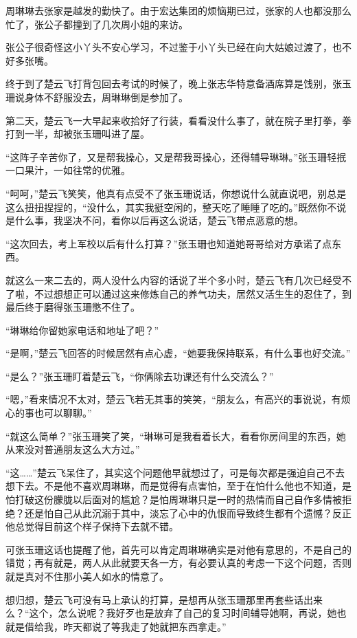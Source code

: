 周琳琳去张家是越发的勤快了。由于宏达集团的烦恼期已过，张家的人也都没那么忙了，张公子都撞到了几次周小姐的来访。

张公子很奇怪这小丫头不安心学习，不过鉴于小丫头已经在向大姑娘过渡了，也不好多张嘴。

终于到了楚云飞打背包回去考试的时候了，晚上张志华特意备酒席算是饯别，张玉珊说身体不舒服没去，周琳琳倒是参加了。

第二天，楚云飞一大早起来收拾好了行装，看看没什么事了，就在院子里打拳，拳打到一半，却被张玉珊叫进了屋。

“这阵子辛苦你了，又是帮我操心，又是帮我哥操心，还得辅导琳琳。”张玉珊轻抿一口果汁，一如往常的优雅。

“呵呵，”楚云飞笑笑，他真有点受不了张玉珊说话，你想说什么就直说吧，别总是这么扭扭捏捏的，“没什么，其实我挺空闲的，整天吃了睡睡了吃的。”既然你不说是什么事，我坚决不问，看你以后再这么说话，楚云飞带点恶意的想。

“这次回去，考上军校以后有什么打算？”张玉珊也知道她哥哥给对方承诺了点东西。

就这么一来二去的，两人没什么内容的话说了半个多小时，楚云飞有几次已经受不了啦，不过想想正可以通过这来修炼自己的养气功夫，居然又活生生的忍住了，到最后终于磨得张玉珊憋不住了。

“琳琳给你留她家电话和地址了吧？”

“是啊，”楚云飞回答的时候居然有点心虚，“她要我保持联系，有什么事也好交流。”

“是么？”张玉珊盯着楚云飞，“你俩除去功课还有什么交流么？”

“嗯，”看来情况不太对，楚云飞若无其事的笑笑，“朋友么，有高兴的事说说，有烦心的事也可以聊聊。”

“就这么简单？”张玉珊笑了笑，“琳琳可是我看着长大，看看你房间里的东西，她从来没对普通朋友这么大方过。”

“这……”楚云飞呆住了，其实这个问题他早就想过了，可是每次都是强迫自己不去想下去。不是他不喜欢周琳琳，而是觉得有点害怕，至于在怕什么他也不知道，是怕打破这份朦胧以后面对的尴尬？是怕周琳琳只是一时的热情而自己自作多情被拒绝？还是怕自己从此沉溺于其中，淡忘了心中的仇恨而导致终生都有个遗憾？反正他总觉得目前这个样子保持下去就不错。

可张玉珊这话也提醒了他，首先可以肯定周琳琳确实是对他有意思的，不是自己的错觉；再有就是，两人从此就要天各一方，有必要认真的考虑一下这个问题，否则就是真对不住那小美人如水的情意了。

想归想，楚云飞可没有马上承认的打算，是想再从张玉珊那里再套些话出来么？“这个，怎么说呢？我好歹也是放弃了自己的复习时间辅导她啊，再说，她也就是借给我，昨天都说了等我走了她就把东西拿走。”

